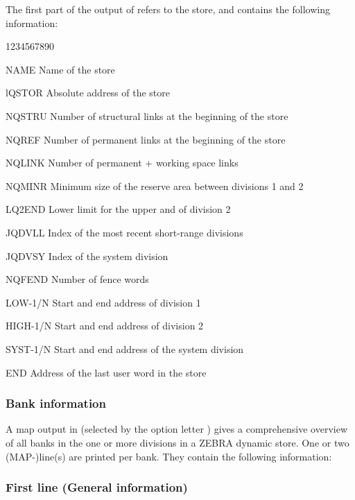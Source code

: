 The first part of the output of  refers to the store,
and contains the following information:
\begin{DLttc}{1234567890}
\item[NAME]Name of the store
\item[lQSTOR]Absolute address  of the store
\item[NQSTRU]Number of structural links at the beginning of the store
\item[NQREF]Number of permanent links at the beginning of the store
\item[NQLINK]Number of permanent + working space links
\item[NQMINR]Minimum size of the reserve area between divisions 1 and 2
\item[LQ2END]Lower limit for the upper and of division 2
\item[JQDVLL]Index of the most recent short-range divisions
\item[JQDVSY]Index of the system division
\item[NQFEND]Number of fence words
\item[LOW-1/N]Start and end address of division 1
\item[HIGH-1/N]Start and end address of division 2
\item[SYST-1/N]Start and end address of the system division
\item[END]Address of the last user word in the store
\end{DLttc}

\subsubsection{Bank information}

A map output in  (selected by the option letter )
gives a comprehensive overview of all banks in
the one or more divisions in a ZEBRA dynamic store.
One or two (MAP-)line(s) are printed per bank.
They contain the following information:

\subsubsection*{First line (General information)}

